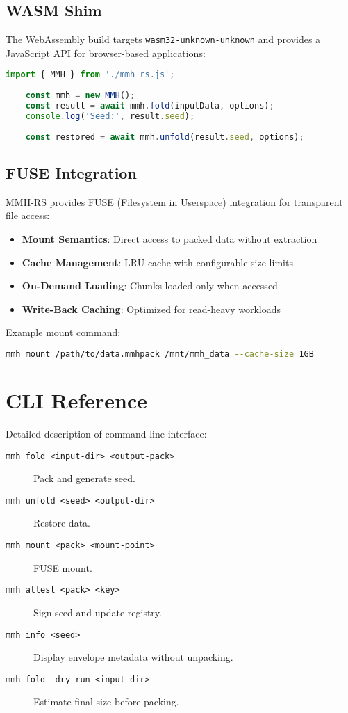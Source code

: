 \documentclass[11pt,a4paper]{article}
\begin{document}
	\subsection{WASM Shim}
	
	The WebAssembly build targets \texttt{wasm32-unknown-unknown} and provides a JavaScript API for browser-based applications:
	
	\begin{lstlisting}[language=javascript,caption={WASM JavaScript API}]
	import { MMH } from './mmh_rs.js';
	
	const mmh = new MMH();
	const result = await mmh.fold(inputData, options);
	console.log('Seed:', result.seed);
	
	const restored = await mmh.unfold(result.seed, options);
	\end{lstlisting}
	
	\subsection{FUSE Integration}
	
	MMH-RS provides FUSE (Filesystem in Userspace) integration for transparent file access:
	
	\begin{itemize}
		\item \textbf{Mount Semantics}: Direct access to packed data without extraction
		\item \textbf{Cache Management}: LRU cache with configurable size limits
		\item \textbf{On-Demand Loading}: Chunks loaded only when accessed
		\item \textbf{Write-Back Caching}: Optimized for read-heavy workloads
	\end{itemize}
	
	Example mount command:
	\begin{lstlisting}[language=bash]
	mmh mount /path/to/data.mmhpack /mnt/mmh_data --cache-size 1GB
	\end{lstlisting}
	
	\section{CLI Reference}
	\label{sec:cli}
	Detailed description of command-line interface:
	\begin{description}
		\item[\texttt{mmh fold <input-dir> <output-pack>}] Pack and generate seed.
		\item[\texttt{mmh unfold <seed> <output-dir>}] Restore data.
		\item[\texttt{mmh mount <pack> <mount-point>}] FUSE mount.
		\item[\texttt{mmh attest <pack> <key>}] Sign seed and update registry.
		\item[\texttt{mmh info <seed>}] Display envelope metadata without unpacking.
		\item[\texttt{mmh fold --dry-run <input-dir>}] Estimate final size before packing.
	\end{description}
	
\end{document}
